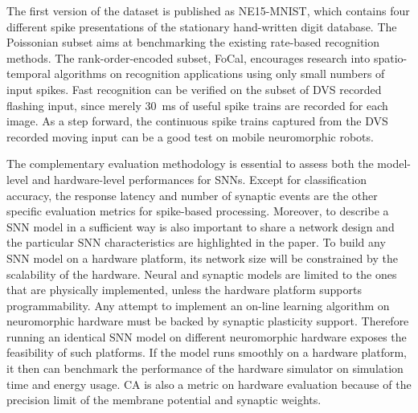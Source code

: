 \documentclass{frontiersENG} %
\begin{document}
The first version of the dataset is published as NE15-MNIST, which contains four different spike presentations of the stationary hand-written digit database.
The Poissonian subset aims at benchmarking the existing rate-based recognition methods.
The rank-order-encoded subset, FoCal, encourages research into spatio-temporal algorithms on recognition applications using only small numbers of input spikes.
Fast recognition can be verified on the subset of DVS recorded flashing input, since merely 30~ms of useful spike trains are recorded for each image.
As a step forward, the continuous spike trains captured from the DVS recorded moving input can be a good test on mobile neuromorphic robots.

The complementary evaluation methodology is essential to assess both the model-level and hardware-level performances for SNNs.
Except for classification accuracy, the response latency and number of synaptic events are the other specific evaluation metrics for spike-based processing.
Moreover, to describe a SNN model in a sufficient way is also important to share a network design and the particular SNN characteristics are highlighted in the paper.  
To build any SNN model on a hardware platform, its network size will be constrained by the scalability of the hardware.
Neural and synaptic models are limited to the ones that are physically implemented, unless the hardware platform supports programmability.
Any attempt to implement an on-line learning algorithm on neuromorphic hardware must be backed by synaptic plasticity support.
Therefore running an identical SNN model on different neuromorphic hardware exposes the feasibility of such platforms.
If the model runs smoothly on a hardware platform, it then can benchmark the performance of the hardware simulator on simulation time and energy usage.
CA is also a metric on hardware evaluation because of the precision limit of the membrane potential and synaptic weights.
\end{document}
